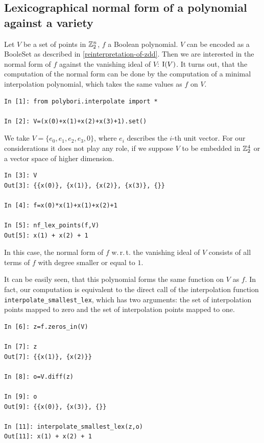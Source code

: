 \subsection{Lexicographical normal form of a polynomial against a variety}

Let $V$ be a set of points in $\mathbb{Z}_2^n$, $f$ a Boolean polynomial. $V$ can be encoded as a BooleSet as described in \ref{reinterpretation-of-zdd}.
Then we are interested in the normal form of $f$ against the vanishing ideal of $V$: $\operatorname{I}(V)$.
It turns out, that the computation of the normal form can be done by the computation of a minimal interpolation polynomial, which takes the same values as $f$ on $V$.

\begin{lstlisting}
In [1]: from polybori.interpolate import *

In [2]: V=(x(0)+x(1)+x(2)+x(3)+1).set()
\end{lstlisting}

We take $V=\{e_0,e_1,e_2,e_3,0\}$, where $e_i$ describes the $i$-th unit vector. For our considerations it does not play any role, if we suppose $V$ to be embedded in $\mathbb{Z}_2^4$ or a vector space of higher dimension.

\begin{lstlisting}
In [3]: V
Out[3]: {{x(0)}, {x(1)}, {x(2)}, {x(3)}, {}}

In [4]: f=x(0)*x(1)+x(1)+x(2)+1

In [5]: nf_lex_points(f,V)
Out[5]: x(1) + x(2) + 1
\end{lstlisting}

In this case, the normal form of $f$ w.\,r.\,t. the vanishing ideal of $V$ consists of all terms of $f$ with degree smaller or equal to $1$.

It can be easily seen, that this polynomial forms the same function on $V$ as $f$.
In fact, our computation is equivalent to the direct call of the interpolation function \lstinline|interpolate_smallest_lex|, which has two arguments: the set of interpolation points mapped to zero and the set of interpolation points mapped to one.

\begin{lstlisting}
In [6]: z=f.zeros_in(V)

In [7]: z
Out[7]: {{x(1)}, {x(2)}}

In [8]: o=V.diff(z)

In [9]: o
Out[9]: {{x(0)}, {x(3)}, {}}

In [11]: interpolate_smallest_lex(z,o)
Out[11]: x(1) + x(2) + 1
\end{lstlisting}
